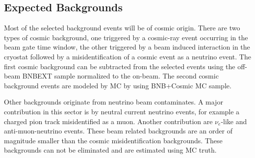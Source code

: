 \begin{table}[!htp] \centering 
  \caption{Passing rates for Selection I selection applied to on-beam and off-beam data. The numbers in brackets give the passing rate wrt the step before (first percentage) and wrt the generated events (second percentage). Off-beam data has been scaled with a factor 1.23 to normalize to the on-beam data stream.} 
  \label{table:data} 
\small 
{} 
\end{table} 
\subsection{Expected Backgrounds}
Most of the selected background events will be of cosmic origin. There are two types of cosmic background, one triggered by a cosmic-ray event occurring in the beam gate time window, the other triggered by a beam induced interaction in the cryostat followed by a misidentification of a cosmic event as a neutrino event. The first cosmic background can be subtracted from the selected events using the off-beam BNBEXT sample normalized to the on-beam. The second cosmic background events are modeled by MC by using BNB+Cosmic MC sample. 

Other backgrounds originate from neutrino beam contaminates. A major contribution in this sector is by neutral current neutrino events, for example a charged pion track misidentified as a muon. Another contribution are $\nu_e$-like and anti-muon-neutrino events. These beam related backgrounds are an order of magnitude smaller than the cosmic misidentification backgrounds. These backgrounds can not be eliminated and are estimated using MC truth.

